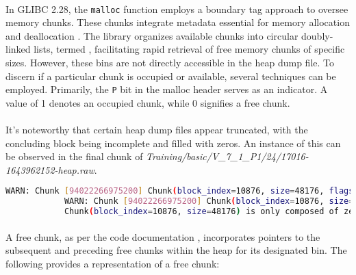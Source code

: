         \paragraph{}In GLIBC 2.28, the \texttt{malloc} function employs a boundary tag approach to oversee memory chunks. These chunks integrate metadata essential for memory allocation and deallocation \cite{gloger_malloc_2001} \cite{delorie_malloc_2023}. The library organizes available chunks into circular doubly-linked lists, termed , facilitating rapid retrieval of free memory chunks of specific sizes. However, these bins are not directly accessible in the heap dump file. To discern if a particular chunk is occupied or available, several techniques can be employed. Primarily, the \texttt{P} bit in the malloc header serves as an indicator. A value of 1 denotes an occupied chunk, while 0 signifies a free chunk.

        \paragraph{}It's noteworthy that certain heap dump files appear truncated, with the concluding block being incomplete and filled with zeros. An instance of this can be observed in the final chunk of \textit{Training/basic/V\_7\_1\_P1/24/17016-1643962152-heap.raw}.

        \begin{lstlisting}[language=bash, caption={Logs from chunk exploration script, highlighting the last chunk of the file \textit{Training/basic/V\_7\_1\_P1/24/17016-1643962152-heap.raw}. }]
            WARN: Chunk [94022266975200] Chunk(block_index=10876, size=48176, flags=[A=False, M=False, P=True]) is out of bounds. Last block index: 16895 Iteration index: 16896 
            WARN: Chunk [94022266975200] Chunk(block_index=10876, size=48176, flags=[A=False, M=False, P=True]) is out of bounds. Last block index: 16895 Iteration index: 16897
            Chunk(block_index=10876, size=48176) is only composed of zeros.
        \end{lstlisting}

        \paragraph{}A free chunk, as per the code documentation \cite{gloger_malloc_2001}, incorporates pointers to the subsequent and preceding free chunks within the heap for its designated bin. The following provides a representation of a free chunk:

